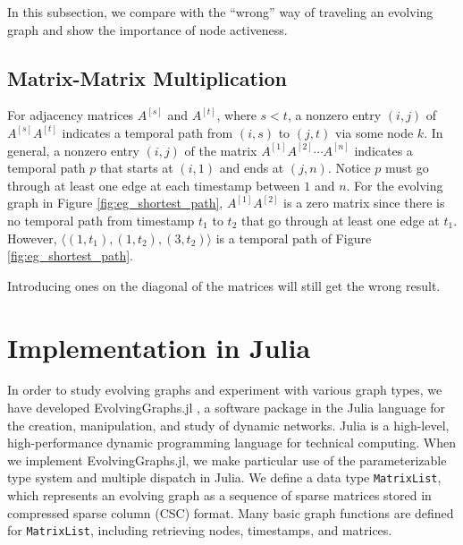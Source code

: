 \documentclass[11pt, conference, , compsocconf]{IEEEtran}
\theoremstyle{definition}
\begin{document}
In this subsection, we compare with the ``wrong'' way of traveling an evolving graph
and show the importance of node activeness. 


\subsection{Matrix-Matrix Multiplication}
\label{sec:matr-matr-mult-1}

For adjacency matrices $A^{[s]}$ and $A^{[t]}$, where $s < t$, a nonzero entry
$(i,j)$ of $A^{[s]} A^{[t]}$ indicates a temporal path from $(i,s)$ to $(j,t)$ via
some node $k$. 
In general, a nonzero entry $(i,j)$ of the matrix $A^{[1]}A^{[2]}\cdots A^{[n]}$ 
indicates a temporal path $p$ that starts at $(i,1)$ and ends at  $(j,n)$. 
Notice $p$ must go through at least one edge at each timestamp between $1$ and $n$.
For the evolving graph in Figure \ref{fig:eg_shortest_path}, $A^{[1]}A^{[2]}$
is a zero matrix since there is no temporal path from timestamp $t_1$ to $t_2$ that
go through at least one edge at $t_1$. However, 
$\langle(1, t_1), (1, t_2), (3,t_2)\rangle$ is a temporal path of Figure \ref{fig:eg_shortest_path}.
 
Introducing ones on the diagonal of the matrices will still get the wrong result.


\section{Implementation in Julia}
\label{sec:implementation-julia}

In order to study evolving graphs and experiment with various graph types, we have developed EvolvingGraphs.jl  \cite{zhang15}, a software package in the Julia language \cite{bkse12} for the creation, manipulation, and study of dynamic networks.  
Julia is a high-level, high-performance dynamic programming language for technical
computing. When we implement EvolvingGraphs.jl, we make particular use of 
the parameterizable type system and multiple dispatch in Julia. 
We define a data type  \texttt{MatrixList}, which represents an evolving graph
as a sequence of sparse matrices stored in compressed sparse column (CSC) format. 
Many basic graph functions are defined for \texttt{MatrixList}, including 
retrieving nodes, timestamps, and matrices.
\end{document}
